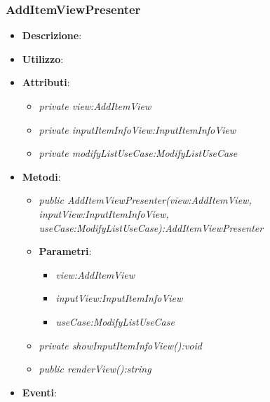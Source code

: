 \subsubsection{AddItemViewPresenter}
\begin{itemize}
\item \textbf{Descrizione}: 
\item \textbf{Utilizzo}:
\item \textbf{Attributi}: 
	\begin{itemize}
	\item \textit{private view:AddItemView}\\
	
	\item \textit{private inputItemInfoView:InputItemInfoView}\\

	\item \textit{private modifyListUseCase:ModifyListUseCase}\\

	\end{itemize}
\item \textbf{Metodi}:
	\begin{itemize}
	\item \textit{public AddItemViewPresenter(view:AddItemView, inputView:InputItemInfoView, useCase:ModifyListUseCase):AddItemViewPresenter}	
		\item{\textbf{Parametri}: \begin{itemize}
		\item \textit{view:AddItemView}\\
		
		\item \textit{inputView:InputItemInfoView}\\
		
		\item \textit{useCase:ModifyListUseCase}\\
		
		\end{itemize}}
	\item \textit{private showInputItemInfoView():void}\\

	\item \textit{public renderView():string}\\

	\end{itemize}
\item \textbf{Eventi}:
\end{itemize}

